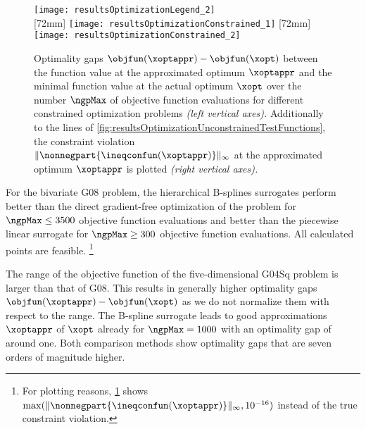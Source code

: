 \begin{figure}
  \texttt{[image: resultsOptimizationLegend\_2]}\\[2mm]%
  [72mm]{%
    \texttt{[image: resultsOptimizationConstrained\_1]}%
  }%
  \hfill%
  [72mm]{%
    \texttt{[image: resultsOptimizationConstrained\_2]}%
  }%
  \caption[Optimality gaps for different objective functions (constrained)]{%
    Optimality gaps $\objfun(\xoptappr) - \objfun(\xopt)$ between
    the function value at the approximated optimum $\xoptappr$ and
    the minimal function value at the actual optimum $\xopt$
    over the number $\ngpMax$ of objective function evaluations
    for different constrained optimization problems
    \emph{(left vertical axes).}
    Additionally to the lines of
    \cref{fig:resultsOptimizationUnconstrainedTestFunctions},
    the constraint violation
    $\norm[\infty]{\nonnegpart{\ineqconfun(\xoptappr)}}$
    at the approximated optimum $\xoptappr$ is plotted
    \emph{(right vertical axes).}%
  }%
  \label{fig:resultsOptimizationConstrainedTestFunctions}%
\end{figure}

For the bivariate G08 problem, the hierarchical B-splines surrogates
perform better than the direct gradient-free optimization of the problem
for $\ngpMax \le 3500$ objective function evaluations
and better than the piecewise linear surrogate for $\ngpMax \ge 300$
objective function evaluations.
All calculated points are feasible.%
\footnote{%
  For plotting reasons,
  \cref{fig:resultsOptimizationConstrainedTestFunctions} shows
  $\max(\norm[\infty]{\nonnegpart{\ineqconfun(\xoptappr)}}, 10^{-16})$
  instead of the true constraint violation.%
}

The range of the objective function of the five-dimensional G04Sq problem
is larger than that of G08.
This results in generally higher optimality gaps
$\objfun(\xoptappr) - \objfun(\xopt)$ as we do not normalize them
with respect to the range.
The B-spline surrogate leads to good approximations $\xoptappr$
of $\xopt$ already for $\ngpMax = 1000$ with an optimality gap of
around one.
Both comparison methods show optimality gaps that are
seven orders of magnitude higher.

